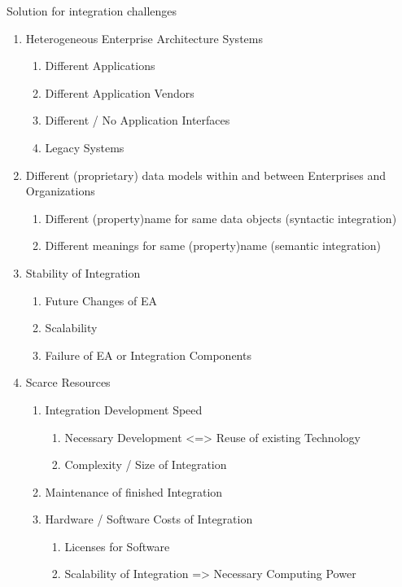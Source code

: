 \documentclass[
     12pt,         %
     a4paper,      %
     BCOR10mm,     %
     DIV14,        %
     ]{scrreprt}
\begin{document}
Solution for integration challenges
\begin{enumerate}
     \item Heterogeneous Enterprise Architecture Systems
           \begin{enumerate}
                \item Different Applications
                \item Different Application Vendors
                \item Different / No Application Interfaces
                \item Legacy Systems
           \end{enumerate}

     \item Different (proprietary) data models within and between Enterprises and Organizations
           \begin{enumerate}
                \item Different (property)name for same data objects (syntactic integration)
                \item Different meanings for same (property)name (semantic integration)
           \end{enumerate}

     \item Stability of Integration
           \begin{enumerate}
                \item Future Changes of EA
                \item Scalability
                \item Failure of EA or Integration Components
           \end{enumerate}

     \item Scarce Resources
           \begin{enumerate}
                \item Integration Development Speed
                      \begin{enumerate}
                           \item Necessary Development <=> Reuse of existing Technology
                           \item Complexity / Size of Integration
                      \end{enumerate}

                \item Maintenance of finished Integration

                \item Hardware / Software Costs of Integration
                      \begin{enumerate}
                           \item Licenses for Software
                           \item Scalability of Integration => Necessary Computing Power
                      \end{enumerate}

           \end{enumerate}

\end{enumerate}
\end{document}
